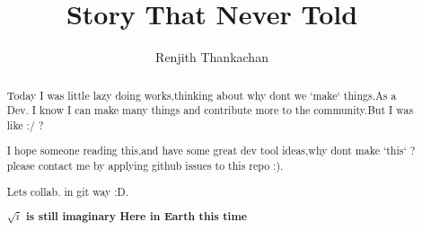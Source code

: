 \documentclass[]{article}
\begin{document}
\title{Story That Never Told}
\author{Renjith Thankachan}
\maketitle

\begin{abstract}
Today I was little lazy doing works,thinking about why dont we `make` things.As a Dev. I know I can make many things and contribute more to the community.But I was like :/ ?

I hope someone reading this,and have some great dev tool ideas,why dont make `this` ? please contact me by applying github issues to this repo :).

Lets collab. in git way :D.

\textbf{$\sqrt{i}$ is still imaginary Here in Earth this time}
\end{abstract}
\end{document}
